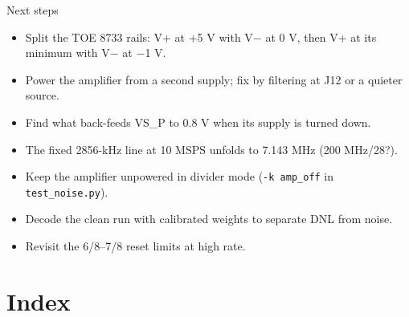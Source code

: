 \begin{frame}{Next steps}
  \begin{itemize}
    \item Split the TOE 8733 rails: V+ at +5 V with V$-$ at 0 V, then V+ at its minimum with V$-$ at $-$1 V.
    \item Power the amplifier from a second supply; fix by filtering at J12 or a quieter source.
    \item Find what back-feeds VS\_P to 0.8 V when its supply is turned down.
    \item The fixed 2856-kHz line at 10 MSPS unfolds to 7.143 MHz (200 MHz/28?).
    \item Keep the amplifier unpowered in divider mode (\texttt{-k amp\_off} in \texttt{test\_noise.py}).
    \item Decode the clean run with calibrated weights to separate DNL from noise.
    \item Revisit the 6/8--7/8 reset limits at high rate.
  \end{itemize}
\end{frame}

\section[Index]{Index}

